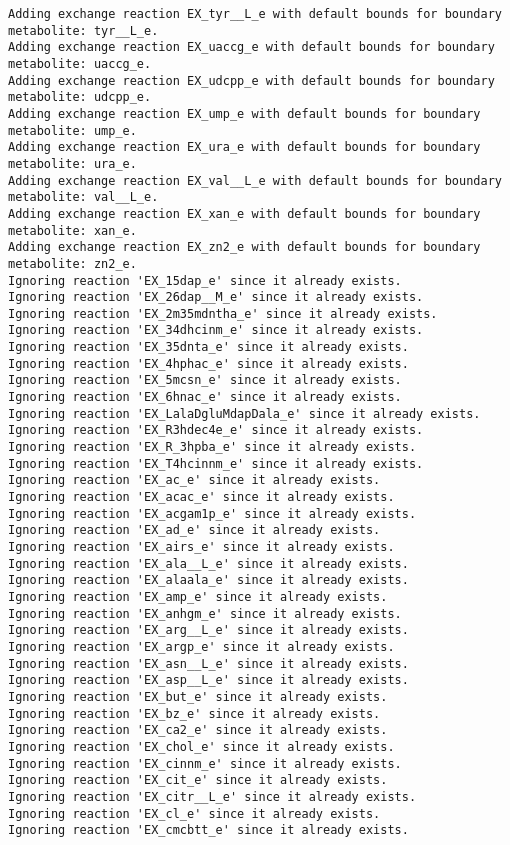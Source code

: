 \documentclass[
  letterpaper,
  DIV=11,
  numbers=noendperiod]{scrartcl}
\begin{document}
\begin{verbatim}
Adding exchange reaction EX_tyr__L_e with default bounds for boundary metabolite: tyr__L_e.
Adding exchange reaction EX_uaccg_e with default bounds for boundary metabolite: uaccg_e.
Adding exchange reaction EX_udcpp_e with default bounds for boundary metabolite: udcpp_e.
Adding exchange reaction EX_ump_e with default bounds for boundary metabolite: ump_e.
Adding exchange reaction EX_ura_e with default bounds for boundary metabolite: ura_e.
Adding exchange reaction EX_val__L_e with default bounds for boundary metabolite: val__L_e.
Adding exchange reaction EX_xan_e with default bounds for boundary metabolite: xan_e.
Adding exchange reaction EX_zn2_e with default bounds for boundary metabolite: zn2_e.
Ignoring reaction 'EX_15dap_e' since it already exists.
Ignoring reaction 'EX_26dap__M_e' since it already exists.
Ignoring reaction 'EX_2m35mdntha_e' since it already exists.
Ignoring reaction 'EX_34dhcinm_e' since it already exists.
Ignoring reaction 'EX_35dnta_e' since it already exists.
Ignoring reaction 'EX_4hphac_e' since it already exists.
Ignoring reaction 'EX_5mcsn_e' since it already exists.
Ignoring reaction 'EX_6hnac_e' since it already exists.
Ignoring reaction 'EX_LalaDgluMdapDala_e' since it already exists.
Ignoring reaction 'EX_R3hdec4e_e' since it already exists.
Ignoring reaction 'EX_R_3hpba_e' since it already exists.
Ignoring reaction 'EX_T4hcinnm_e' since it already exists.
Ignoring reaction 'EX_ac_e' since it already exists.
Ignoring reaction 'EX_acac_e' since it already exists.
Ignoring reaction 'EX_acgam1p_e' since it already exists.
Ignoring reaction 'EX_ad_e' since it already exists.
Ignoring reaction 'EX_airs_e' since it already exists.
Ignoring reaction 'EX_ala__L_e' since it already exists.
Ignoring reaction 'EX_alaala_e' since it already exists.
Ignoring reaction 'EX_amp_e' since it already exists.
Ignoring reaction 'EX_anhgm_e' since it already exists.
Ignoring reaction 'EX_arg__L_e' since it already exists.
Ignoring reaction 'EX_argp_e' since it already exists.
Ignoring reaction 'EX_asn__L_e' since it already exists.
Ignoring reaction 'EX_asp__L_e' since it already exists.
Ignoring reaction 'EX_but_e' since it already exists.
Ignoring reaction 'EX_bz_e' since it already exists.
Ignoring reaction 'EX_ca2_e' since it already exists.
Ignoring reaction 'EX_chol_e' since it already exists.
Ignoring reaction 'EX_cinnm_e' since it already exists.
Ignoring reaction 'EX_cit_e' since it already exists.
Ignoring reaction 'EX_citr__L_e' since it already exists.
Ignoring reaction 'EX_cl_e' since it already exists.
Ignoring reaction 'EX_cmcbtt_e' since it already exists.

\end{verbatim}
\end{document}
